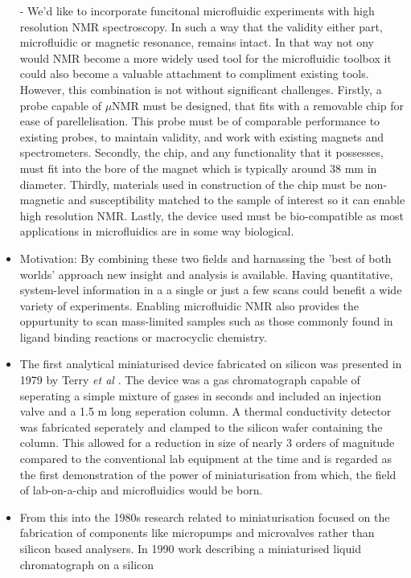 \begin{itemize}
- We'd like to incorporate funcitonal microfluidic experiments with high resolution NMR spectroscopy. In
such a way that the validity either part, microfluidic or magnetic resonance, remains intact. In that
way not ony would NMR become a more widely used tool for the microfluidic toolbox it could also
become a valuable attachment to compliment existing tools. However, this combination
is not without significant challenges. Firstly, a probe capable of $\mu$NMR must be designed, that fits
with a removable chip for ease of parellelisation. This probe must be of comparable performance
to existing probes, to maintain validity, and work with existing magnets and spectrometers. Secondly, the
chip, and any functionality that it possesses, must fit into the bore of the magnet which is typically around
38 mm in diameter. Thirdly, materials used in construction of the chip must be non-magnetic and susceptibility
matched to the sample of interest so it can enable high resolution NMR. Lastly, the device used must be
bio-compatible as most applications in microfluidics are in some way biological.
  \item Motivation: By combining these two fields and harnassing the 'best of both worlds' approach
new insight and analysis is available. Having quantitative, system-level information in a
a single or just a few scans could benefit a wide variety of experiments. Enabling microfluidic
NMR also provides the oppurtunity to scan mass-limited samples such as those commonly found in
ligand binding reactions or macrocyclic chemistry.
  \item The first analytical miniaturised device fabricated on silicon was presented in 1979 by Terry \textit{et al}
  \citep{terry1979ieee}. The device was a gas chromatograph capable of seperating a simple mixture of gases
  in seconds and included an injection valve and a 1.5 m long seperation column. A thermal conductivity detector
  was fabricated seperately and clamped to the silicon wafer containing the column. This allowed for
  a reduction in size of nearly 3 orders of magnitude compared to the conventional lab equipment at the time
  and is regarded\citep{reyes2002micro} as the first demonstration of the power of miniaturisation from which, the
  field of lab-on-a-chip and microfluidics would be born.
  \item From this into the 1980s research related to miniaturisation focused on the fabrication of
  components like micropumps\citep{van1988piezoelectric,van1989thermo} and microvalves\citep{shoji1988prototype}
  rather than silicon based analysers. In 1990 work describing a miniaturised liquid chromatograph on a silicon

\end{itemize}
